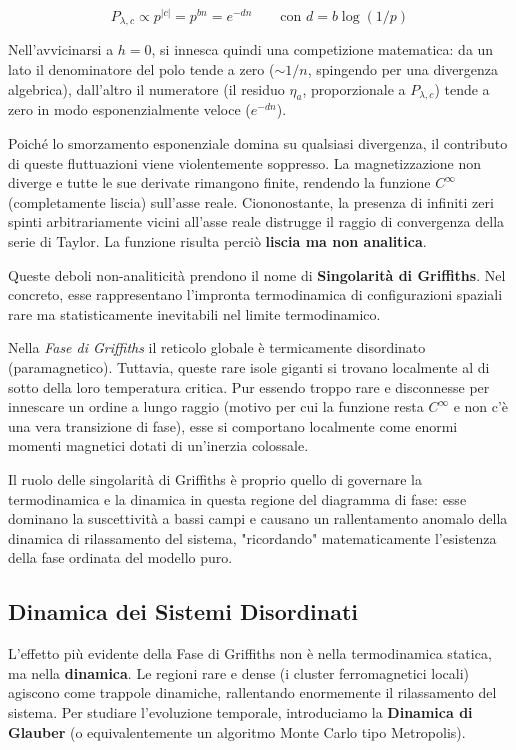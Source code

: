 \begin{equation}
P_{\lambda,c} \propto p^{|c|} = p^{bn} = e^{-d n}  \quad \quad \text{con } d = b \log(1/p)
\end{equation}

\noindent Nell'avvicinarsi a $h=0$, si innesca quindi una competizione matematica: da un lato il denominatore del polo tende a zero ($\sim 1/n$, spingendo per una divergenza algebrica), dall'altro il numeratore (il residuo $\eta_a$, proporzionale a $P_{\lambda,c}$) tende a zero in modo esponenzialmente veloce ($e^{-dn}$). 

\noindent Poiché lo smorzamento esponenziale domina su qualsiasi divergenza, il contributo di queste fluttuazioni viene violentemente soppresso. La magnetizzazione non diverge e tutte le sue derivate rimangono finite, rendendo la funzione $C^\infty$ (completamente liscia) sull'asse reale. Ciononostante, la presenza di infiniti zeri spinti arbitrariamente vicini all'asse reale distrugge il raggio di convergenza della serie di Taylor. La funzione risulta perciò \textbf{liscia ma non analitica}.


\noindent Queste deboli non-analiticità prendono il nome di \textbf{Singolarità di Griffiths}. Nel concreto, esse rappresentano l'impronta termodinamica di configurazioni spaziali rare ma statisticamente inevitabili nel limite termodinamico. 

Nella \textit{Fase di Griffiths} il reticolo globale è termicamente disordinato (paramagnetico). Tuttavia, queste rare isole giganti si trovano localmente al di sotto della loro temperatura critica. Pur essendo troppo rare e disconnesse per innescare un ordine a lungo raggio (motivo per cui la funzione resta $C^\infty$ e non c'è una vera transizione di fase), esse si comportano localmente come enormi momenti magnetici dotati di un'inerzia colossale. 

Il ruolo delle singolarità di Griffiths è proprio quello di governare la termodinamica e la dinamica in questa regione del diagramma di fase: esse dominano la suscettività a bassi campi e causano un rallentamento anomalo della dinamica di rilassamento del sistema, "ricordando" matematicamente l'esistenza della fase ordinata del modello puro.

\subsection{Dinamica dei Sistemi Disordinati}
L'effetto più evidente della Fase di Griffiths non è nella termodinamica statica, ma nella \textbf{dinamica}. Le regioni rare e dense (i cluster ferromagnetici locali) agiscono come trappole dinamiche, rallentando enormemente il rilassamento del sistema. Per studiare l'evoluzione temporale, introduciamo la \textbf{Dinamica di Glauber} (o equivalentemente un algoritmo Monte Carlo tipo Metropolis).

